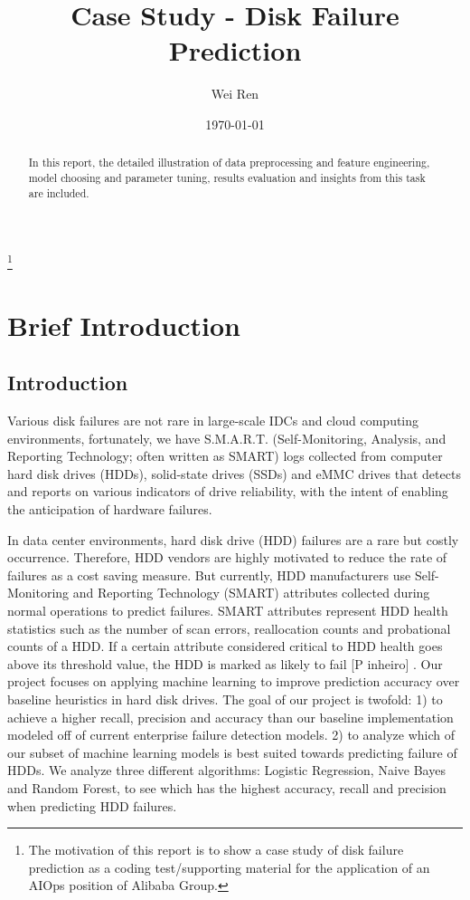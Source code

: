 \documentclass[12pt,a4paper,english]{amsart}
\begin{document}
\title{Case Study - Disk Failure Prediction}%
\author{Wei Ren}%
%

\date{\today}
\thanks{The motivation of this report is to show a case study of disk failure prediction as a coding test/supporting material for the application of an AIOps position of Alibaba Group.}
\begin{abstract}
  In this report, the detailed illustration of data preprocessing and feature engineering, model choosing and parameter tuning, results evaluation and insights from this task are included.
\end{abstract}
\maketitle
\section{Brief Introduction}

\subsection{Introduction}

Various disk failures are not rare in large-scale IDCs and cloud computing environments, fortunately, we have S.M.A.R.T. (Self-Monitoring, Analysis, and Reporting Technology; often written as SMART) logs collected from computer hard disk drives (HDDs), solid-state drives (SSDs) and eMMC drives that detects and reports on various indicators of drive reliability, with the intent of enabling the anticipation of hardware failures.

In data center environments, hard disk drive (HDD) failures are a rare but costly occurrence. Therefore, HDD vendors are highly motivated to reduce the rate of failures as a cost saving measure. But currently, HDD manufacturers use Self-Monitoring and Reporting Technology (SMART) attributes collected during normal operations to predict failures. SMART attributes represent HDD health statistics such as the number of scan errors, reallocation counts and probational counts of a HDD. If a certain attribute considered critical to HDD health goes above  its  threshold  value,  the  HDD  is  marked  as  likely  to  fail  [P  inheiro] .
Our project focuses on applying machine learning to improve prediction accuracy over baseline heuristics in hard disk drives. The goal of our project is twofold: 1) to achieve a higher recall, precision and accuracy than our baseline implementation modeled off of current enterprise failure detection models. 2) to analyze which of our subset of machine learning models is best suited towards predicting failure of HDDs. We analyze three different algorithms: Logistic Regression, Naive Bayes and Random Forest, to see which has the highest accuracy, recall and precision when   predicting   HDD   failures.
\end{document}
